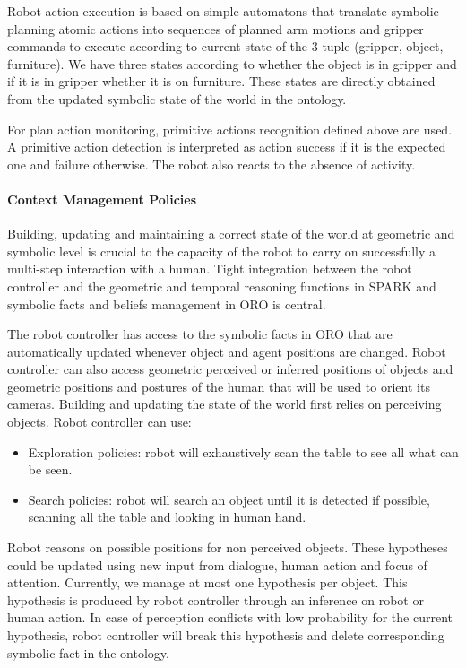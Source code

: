 \documentclass[preprint,5p]{elsarticle}
\begin{document}
Robot action execution is based on simple automatons  that translate
symbolic planning atomic actions into sequences of planned arm motions
and gripper commands to execute according to current state
of the 3-tuple (gripper, object, furniture). We have three states
according to whether the object is in gripper and if it is in gripper
whether it is on furniture.  These states are directly obtained from
the updated symbolic state of the world in the ontology.

For plan action monitoring, primitive actions recognition defined
above are used. A primitive action detection is interpreted as action
success if it is the expected one and failure otherwise. The robot
also reacts to the absence of activity.


\paragraph{Context Management Policies} 
Building, updating and maintaining a correct state of the world at
geometric and symbolic level is crucial to the capacity of the robot
to carry on successfully a multi-step interaction with a human. Tight
integration between the robot controller and the geometric and
temporal reasoning functions in SPARK and symbolic facts and beliefs
management in ORO is central.
 
The robot controller has access to the symbolic facts in ORO that are
automatically updated whenever object and agent positions are changed.
Robot controller can also access geometric perceived or inferred
positions of objects and geometric positions and postures of the human
that will be used to orient its cameras.  Building and updating the
state of the world first relies on perceiving objects. Robot
controller can use:

\begin {itemize}
\item Exploration policies: robot will exhaustively scan the table to
  see all what can be seen.

\item Search policies: robot will search an object until it is
  detected if possible, scanning all the table and looking in human
  hand.

\end {itemize} 

Robot reasons on possible positions for non perceived objects. These hypotheses
could be updated using new input from dialogue, human action and focus of
attention. Currently, we manage at most one hypothesis per object. This
hypothesis is produced by robot controller through an inference on robot or
human action. In case of perception conflicts with low probability for the
current hypothesis, robot controller will break this hypothesis and delete
corresponding symbolic fact in the ontology.
\end{document}
